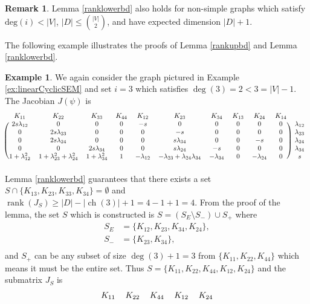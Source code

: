 \documentclass[12pt,reqno]{amsart}
\theoremstyle{plain}
\theoremstyle{definition}
\newtheorem{example}[theorem]{Example}
\newtheorem{remark}[theorem]{Remark}
\DeclareMathOperator{\ch}{ch}
\DeclareMathOperator{\rank}{rank}
\begin{document}
\begin{remark}
Lemma \ref{ranklowerbd} also holds for non-simple graphs which satisfy $\text{deg}(i)< |V|$, $|D|\leq \binom{|V|}{2}$, and have expected dimension $|D|+1$. 
\end{remark}

The following example illustrates the proofs of Lemma \ref{rankupbd} and Lemma \ref{ranklowerbd}.

\begin{example}
We again consider the graph pictured in Example \ref{ex:linearCyclicSEM} and set $i=3$ which satisfies $\deg(3) = 2 < 3 = |V| - 1$. 
The Jacobian $J(\psi)$ is
\[
\begin{blockarray}{ccccccccccc}
K_{11} & K_{22} & K_{33} & K_{44} & K_{12} & K_{23} & K_{34} & K_{13} & K_{24} & K_{14} \\
\begin{block}{(cccccccccc)c}
  2s\lambda_{12} & 0 & 0 & 0    & -s & 0 & 0 & 0 & 0 & 0 & \lambda_{12}\\
  0 & 2s\lambda_{23} & 0 & 0    & 0 & -s & 0 & 0 & 0 & 0 & \lambda_{23}\\
  0 & 2s\lambda_{24} & 0 & 0    & 0 & s\lambda_{34} & 0 & 0 & -s & 0 & \lambda_{24}\\
  0 & 0 & 2s\lambda_{34} & 0    & 0 & s\lambda_{24} & -s & 0 & 0 & 0 & \lambda_{34}\\
  1+\lambda_{12}^2 & 1+\lambda_{23}^2+\lambda_{24}^2 & 1+\lambda_{34}^2 & 1 & -\lambda_{12} & -\lambda_{23}+\lambda_{24}\lambda_{34} & -\lambda_{34} & 0 & -\lambda_{24} & 0 & s\\
\end{block}
\end{blockarray}
\]
Lemma \ref{ranklowerbd} guarantees that there exists a set $S \cap \{K_{13}, K_{23}, K_{33}, K_{34}\} = \emptyset$ and $\rank(J_S) \geq |D| - |\ch(3)| + 1 = 4 - 1 + 1 = 4$. 
From the proof of the lemma, the set $S$ which is constructed is $S = (S_E \setminus S_-) \cup S_+$ where
\begin{align*}
S_E &= \{K_{12}, K_{23}, K_{34}, K_{24}\},\\
S_- &= \{K_{23}, K_{34} \}, \\
\end{align*}
and $S_+$ can be any subset of size $\deg(3)+1=3$ from $\{K_{11}, K_{22}, K_{44}\}$ which means it must be the entire set. Thus $S = \{K_{11}, K_{22}, K_{44}, K_{12}, K_{24}\}$ and the submatrix $J_S$ is
\[
\begin{blockarray}{cccccc}
K_{11} & K_{22} & K_{44} & K_{12} & K_{24} \\

\end{blockarray}\]
\end{example}
\end{document}
